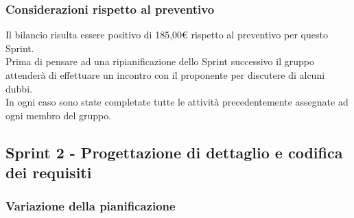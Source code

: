 \subsubsection{Considerazioni rispetto al preventivo} \label{subsubsection:considerazioni_finali_sprint1}
Il bilancio risulta essere positivo di 185,00€ rispetto al preventivo per questo Sprint\glo{}.
\\Prima di pensare ad una ripianificazione dello Sprint\glo{} successivo il gruppo attenderà di effettuare un incontro con il proponente per discutere di alcuni dubbi.
\\In ogni caso sono state completate tutte le attività precedentemente assegnate ad ogni membro del gruppo.


\subsection{Sprint 2 - Progettazione di dettaglio e codifica dei requisiti} \label{subsection:consuntivo_sprint2}
\subsubsection{Variazione della pianificazione} \label{subsubsection:variazione_pianificazione_sprint2}

